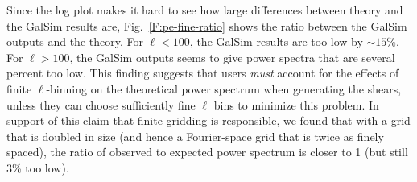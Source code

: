 \documentclass[preprint]{aastex}
\begin{document}
Since the log plot makes it hard to see how large differences between
theory and the GalSim results are, Fig.~\ref{F:pe-fine-ratio} shows
the ratio between the GalSim outputs and the theory.  For $\ell<100$,
the GalSim results are too low by $\sim 15$\%.  For $\ell>100$, the
GalSim outputs seems to give power spectra that are several percent too low.  This
finding suggests that users {\em must} account for the effects of
finite $\ell$-binning on the theoretical power spectrum when
generating the shears, unless they
can choose sufficiently fine $\ell$ bins to minimize
this problem.  In support of this claim that finite gridding is
responsible, we found that with a grid that is doubled in size (and
hence a Fourier-space grid that is twice as finely spaced), the ratio
of observed to expected power spectrum is closer to 1 (but still 3\%
too low).
\end{document}
